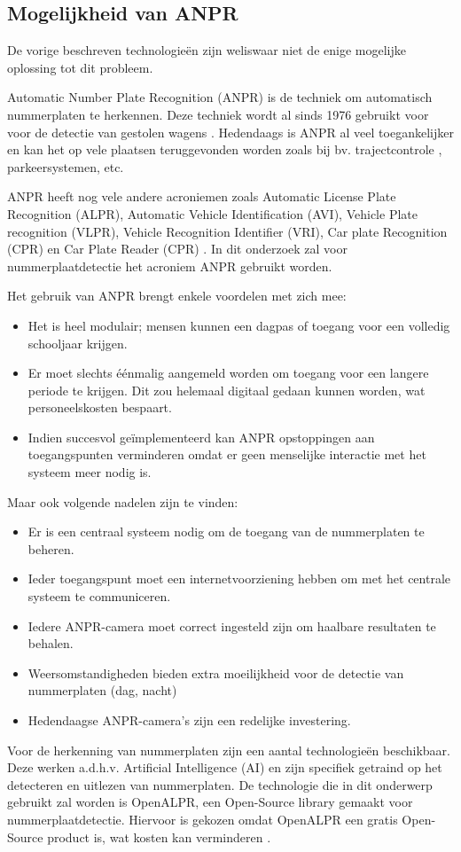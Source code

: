 \subsection{Mogelijkheid van ANPR}
De vorige beschreven technologieën zijn weliswaar niet de enige mogelijke oplossing tot dit probleem.

Automatic Number Plate Recognition (ANPR) is de techniek om automatisch nummerplaten te herkennen. Deze techniek wordt al sinds 1976 gebruikt voor voor de detectie van gestolen wagens \autocite{uk2011anpr}. Hedendaags is ANPR al veel toegankelijker en kan het op vele plaatsen teruggevonden worden zoals bij bv. trajectcontrole \autocite{de2014snelheidscamera}, parkeersystemen, etc.
\par
ANPR heeft nog vele andere acroniemen zoals Automatic License Plate Recognition (ALPR), Automatic Vehicle Identification (AVI), Vehicle Plate recognition (VLPR), Vehicle Recognition Identifier (VRI), Car plate Recognition (CPR) en Car Plate Reader (CPR) \autocite{axis2019license}. In dit onderzoek zal voor nummerplaatdetectie het acroniem ANPR gebruikt worden.
\par
Het gebruik van ANPR brengt enkele voordelen met zich mee:
\begin{itemize}
	\item Het is heel modulair; mensen kunnen een dagpas of toegang voor een volledig schooljaar krijgen.
	\item Er moet slechts éénmalig aangemeld worden om toegang voor een langere periode te krijgen. Dit zou helemaal digitaal gedaan kunnen worden, wat personeelskosten bespaart.
	\item Indien succesvol geïmplementeerd kan ANPR opstoppingen aan toegangspunten verminderen omdat er geen menselijke interactie met het systeem meer nodig is.
\end{itemize}
\par
Maar ook volgende nadelen zijn te vinden:
\begin{itemize}
	\item Er is een centraal systeem nodig om de toegang van de nummerplaten te beheren.
	\item Ieder toegangspunt moet een internetvoorziening hebben om met het centrale systeem te communiceren.
	\item Iedere ANPR-camera moet correct ingesteld zijn om haalbare resultaten te behalen.
	\item Weersomstandigheden bieden extra moeilijkheid voor de detectie van nummerplaten (dag, nacht)
	\item Hedendaagse ANPR-camera's zijn een redelijke investering.
\end{itemize}
\par
Voor de herkenning van nummerplaten zijn een aantal technologieën beschikbaar. Deze werken a.d.h.v. Artificial Intelligence (AI) en zijn specifiek getraind op het detecteren en uitlezen van nummerplaten.
De technologie die in dit onderwerp gebruikt zal worden is OpenALPR, een Open-Source library gemaakt voor nummerplaatdetectie. Hiervoor is gekozen omdat OpenALPR een gratis Open-Source product is, wat kosten kan verminderen \autocite{openalprgithub}.



